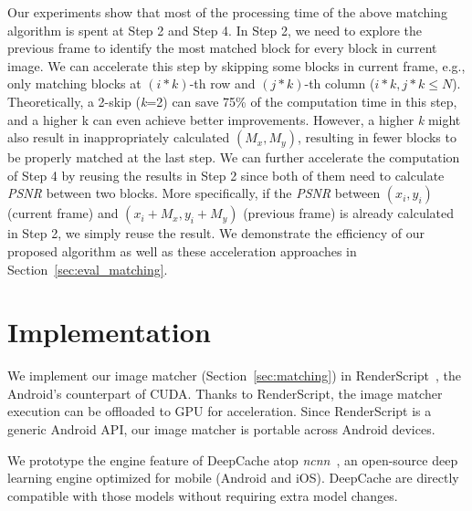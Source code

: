 \documentclass[10pt,acmtog]{acmart}
\newcommand{\framework}{DeepCache\xspace}
\newcommand{\sys}{\framework{}}
\begin{document}
Our experiments show that most of the processing time of the above matching algorithm is spent at Step 2 and Step 4.
In Step 2, we need to explore the previous frame to identify the most matched block for every block in current image.
We can accelerate this step by skipping some blocks in current frame, e.g., only matching blocks at $(i*k)$-th row and $(j*k)$-th column ($i*k,j*k\leqslant N$).
Theoretically, a 2-skip (\emph{k}=2) can save 75\% of the computation time in this step, and a higher k can even achieve better improvements.
However, a higher \emph{k} might also result in inappropriately calculated $(M_x,M_y)$, resulting in fewer blocks to be properly matched at the last step.
We can further accelerate the computation of Step 4 by reusing the results in Step 2 since both of them need to calculate \emph{PSNR} between two blocks.
More specifically, if the \emph{PSNR} between $(x_i,y_i)$ (current frame) and $(x_i+M_x,y_i+M_y)$ (previous frame) is already calculated in Step 2, we simply reuse the result.
We demonstrate the efficiency of our proposed algorithm as well as these acceleration approaches in Section~\ref{sec:eval_matching}.

\section{Implementation}\label{sec:impl}

We implement our image matcher (Section~\ref{sec:matching}) in RenderScript~\cite{RenderScript}, the Android's counterpart of CUDA. 
Thanks to RenderScript, the image matcher execution can be offloaded to GPU for acceleration. 
Since RenderScript is a generic Android API, our image matcher is portable across Android devices. 

We prototype the engine feature of \sys{} atop \emph{ncnn}~\cite{ncnn}, an open-source deep learning engine optimized for mobile (Android and iOS).
\framework are directly compatible with those models without requiring extra model changes.
\end{document}
